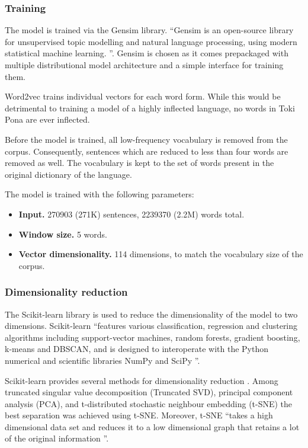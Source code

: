 \documentclass[14pt, a4paper]{extreport}
\begin{document}
      \subsubsection{Training}
The model is trained via the Gensim library. ``Gensim is an open-source library for unsupervised topic modelling and natural language processing, using modern statistical machine learning. \parencite{gensim}''. Gensim is chosen as it comes prepackaged with multiple distributional model architecture and a simple interface for training them.

Word2vec trains individual vectors for each word form. While this would be detrimental to training a model of a highly inflected language, no words in Toki Pona are ever inflected.

Before the model is trained, all low-frequency vocabulary is removed from the corpus. Consequently, sentences which are reduced to less than four words are removed as well. The vocabulary is kept to the set of words present in the original dictionary of the language.

The model is trained with the following parameters:

\begin{itemize}
  \item \textbf{Input.} 270903 (271K) sentences, 2239370 (2.2M) words total.
  \item \textbf{Window size.} 5 words.
  \item \textbf{Vector dimensionality.} 114 dimensions, to match the vocabulary size of the corpus.
\end{itemize}
      \subsubsection{Dimensionality reduction}
The Scikit-learn library is used to reduce the dimensionality of the model to two dimensions. Scikit-learn ``features various classification, regression and clustering algorithms including support-vector machines, random forests, gradient boosting, k-means and DBSCAN, and is designed to interoperate with the Python numerical and scientific libraries NumPy and SciPy \parencite{scikit}''.

Scikit-learn provides several methods for dimensionality reduction \parencite{tsne}. Among truncated singular value decomposition (Truncated SVD), principal component analysis (PCA), and t-distributed stochastic neighbour embedding (t-SNE) the best separation was achieved using t-SNE. Moreover, t-SNE ``takes a high dimensional data set and reduces it to a low dimensional graph that retains a lot of the original information \parencite{dimred}''.
\end{document}
